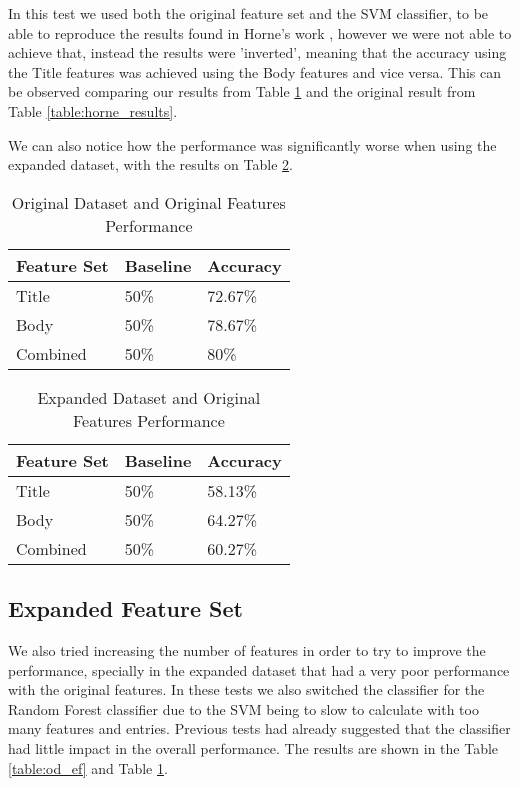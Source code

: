 \documentclass[conference]{IEEEtran}
\begin{document}
In this test we used both the original feature set and the SVM classifier, to be able to reproduce the results
found in Horne's work \cite{horne_2017}, however we were not able to achieve that, instead the results were
'inverted', meaning that the accuracy using the Title features was achieved using the Body features and vice versa.
This can be observed comparing our results from Table \ref{table:od_of} and the original result from Table \ref{table:horne_results}.

We can also notice how the performance was significantly worse when using the expanded dataset, with the results
on Table \ref{table:ed_of}.

\begin{table}[htbp]
\caption{Original Dataset and Original Features Performance}
\begin{center}
\begin{tabular}{ |l|l|l| }
\hline
Feature Set & Baseline & Accuracy \\
\hline
Title & 50\% & 72.67\% \\
\hline
Body & 50\% & 78.67\% \\
\hline
Combined & 50\% & 80\% \\
\hline
\end{tabular}
\label{table:od_of}
\end{center}
\end{table}

\begin{table}[htbp]
\caption{Expanded Dataset and Original Features Performance}
\begin{center}
\begin{tabular}{ |l|l|l| }
\hline
Feature Set & Baseline & Accuracy \\
\hline
Title & 50\% & 58.13\% \\
\hline
Body & 50\% & 64.27\% \\
\hline
Combined & 50\% & 60.27\% \\
\hline
\end{tabular}
\label{table:ed_of}
\end{center}
\end{table}

\subsection{Expanded Feature Set}

We also tried increasing the number of features in order to try to improve the performance,
specially in the expanded dataset that had a very poor performance with the original features.
In these tests we also switched the classifier for the Random Forest classifier due to the
SVM being to slow to calculate with too many features and entries. Previous tests had already
suggested that the classifier had little impact in the overall performance.
The results are shown in the Table \ref{table:od_ef} and Table \ref{table:od_of}.
\end{document}
